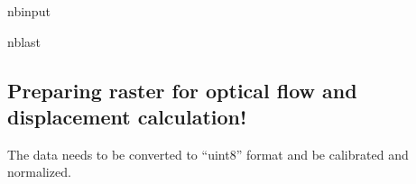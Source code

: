 \documentclass[letterpaper,10pt,english]{sphinxmanual}
\begin{document}
\begin{sphinxuseclass}{nbinput}
\begin{sphinxuseclass}{nblast}
{
\begin{sphinxVerbatim}[commandchars=\\\{\}]
\llap{\color{nbsphinxin}[ ]:\,\hspace{\fboxrule}\hspace{\fboxsep}}


                               


\end{sphinxVerbatim}
}

\end{sphinxuseclass}
\end{sphinxuseclass}

\subsection{Preparing raster for optical flow and displacement calculation!}
\label{\detokenize{notebooks/MudCreek_Landslide_optical:Preparing-raster-for-optical-flow-and-displacement-calculation!}}
\sphinxAtStartPar
The data needs to be converted to “uint8” format and be calibrated and normalized.
\end{document}
